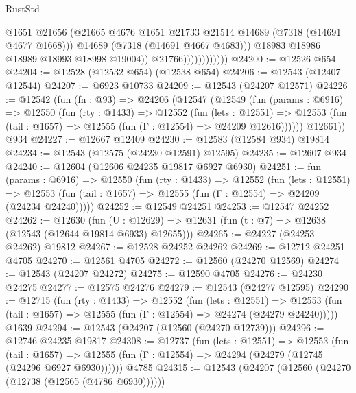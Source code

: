 \begin{lexlean}{RustStd}
\begin{coremodule}
                                  @1651
                                  @21656
                                  (@21665
                                    @4676
                                    @1651
                                    @21733
                                    @21514
                                    @14689
                                    (@7318 (@14691 @4677 @1668)))
                                  @14689
                                  (@7318 (@14691 @4667 @4683)))
                                @18983
                                @18986
                                @18989
                                @18993
                                @18998
                                @19004))
                            @21766))))))))))))
@24200 := @12526 @654
@24204 := @12528 (@12532 @654) (@12538 @654)
@24206 := @12543 (@12407 @12544)
@24207 := @6923 @10733
@24209 := @12543 (@24207 @12571)
@24226 := @12542
    (fun (fn : @93) =>
    @24206
      (@12547
        (@12549
          (fun (params : @6916) =>
          @12550
            (fun (rty : @1433) =>
            @12552
              (fun (lets : @12551) =>
              @12553 (fun (tail : @1657) => @12555 (fun (Γ : @12554) => @24209 @12616))))))
        @12661))
    @934
@24227 := @12667 @12409
@24230 := @12583 (@12584 @934) @19814
@24234 := @12543 (@12575 (@24230 @12591) @12595)
@24235 := @12607 @934
@24240 := @12604 (@12606 @24235 @19817 @6927 @6930)
@24251 := fun (params : @6916) =>
  @12550
    (fun (rty : @1433) =>
    @12552
      (fun (lets : @12551) =>
      @12553 (fun (tail : @1657) => @12555 (fun (Γ : @12554) => @24209 (@24234 @24240)))))
@24252 := @12549 @24251
@24253 := @12547 @24252
@24262 := @12630
    (fun (U : @12629) => @12631 (fun (t : @7) => @12638 (@12543 (@12644 @19814 @6933) @12655)))
@24265 := @24227 (@24253 @24262) @19812
@24267 := @12528 @24252 @24262
@24269 := @12712 @24251 @4705
@24270 := @12561 @4705
@24272 := @12560 (@24270 @12569)
@24274 := @12543 (@24207 @24272)
@24275 := @12590 @4705
@24276 := @24230 @24275
@24277 := @12575 @24276
@24279 := @12543 (@24277 @12595)
@24290 := @12715
    (fun (rty : @1433) =>
    @12552
      (fun (lets : @12551) =>
      @12553 (fun (tail : @1657) => @12555 (fun (Γ : @12554) => @24274 (@24279 @24240)))))
    @1639
@24294 := @12543 (@24207 (@12560 (@24270 @12739)))
@24296 := @12746 @24235 @19817
@24308 := @12737
    (fun (lets : @12551) =>
    @12553
      (fun (tail : @1657) =>
      @12555 (fun (Γ : @12554) => @24294 (@24279 (@12745 (@24296 @6927 @6930))))))
    @4785
@24315 := @12543 (@24207 (@12560 (@24270 (@12738 (@12565 (@4786 @6930))))))

\end{coremodule}
\end{lexlean}
